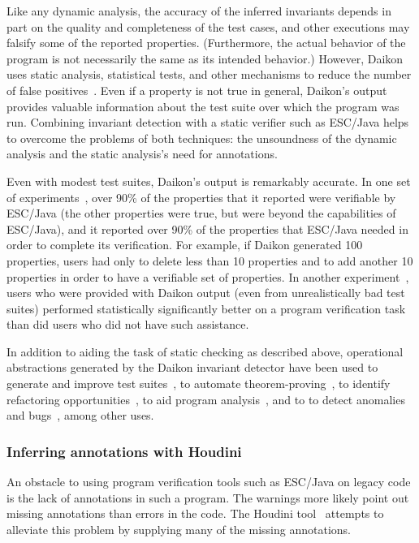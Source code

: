 Like any dynamic analysis, the accuracy of the inferred invariants
depends in part on the quality and completeness of the test cases, and
other executions may falsify some of the reported properties.
(Furthermore, the actual behavior of the program is not necessarily
the same as its intended behavior.)  However, Daikon uses static
analysis, statistical tests, and other mechanisms to reduce the number
of false positives~\cite{ErnstCGN2000:Relevance}.  Even if a property
is not true in general, Daikon's output provides valuable information
about the test suite over which the program was run.  Combining
invariant detection with a static verifier such as ESC/Java helps to
overcome the problems of both techniques: the unsoundness of the
dynamic analysis and the static analysis's need for annotations.

Even with modest test suites, Daikon's output is remarkably accurate.
In one set of experiments~\cite{NimmerE02:ISSTA}, over 90\% of the
properties that it reported were verifiable by ESC/Java (the other
properties were true, but were beyond the capabilities of ESC/Java),
and it reported over 90\% of the properties that ESC/Java needed in
order to complete its verification.  For example, if Daikon generated
100 properties, users had only to delete less than 10 properties and
to add another 10 properties in order to have a verifiable set of
properties.  In another experiment~\cite{NimmerE02:FSE}, users who
were provided with Daikon output (even from unrealistically bad test
suites) performed statistically significantly better on a program
verification task than did users who did not have such assistance.

In addition to aiding the task of static checking as described above,
operational abstractions generated by the Daikon invariant detector
have been used to generate and improve test
suites~\cite{HarderME03,XieN2003:ASE,GuptaH2003}, to automate
theorem-proving~\cite{NeWinE02:TR841,NeWinEGKL04:STTT}, to identify
refactoring opportunities~\cite{KataokaEGN01}, to aid program
analysis~\cite{DodooDLE02,DodooLE2003:TR}, and to to detect anomalies
and bugs~\cite{RazKS2002,GroceV2003,Brun2003}, among other uses.

\subsubsection{Inferring annotations with Houdini}
\label{houdini}

An obstacle to using program verification tools such as ESC/Java on
legacy code is the lack of annotations in such a program.  The
warnings
more likely point out missing annotations than errors in the code.
The Houdini tool~\cite{Flanagan-Et-Al01,Houdini-theory:IPL} attempts
to alleviate this problem by supplying many of the missing
annotations.

